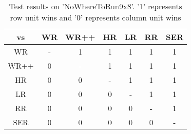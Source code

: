 \begin{table}[h]
    \centering
    \caption{Test results on 'NoWhereToRun9x8'. '1' represents row unit wins and '0' represents column unit wins}
    \label{table:NoWhereToRun9x8}
    \begin{tabular}{c|cccccc}
        \toprule
        vs & WR & WR++ & HR & LR & RR & SER \\
        \midrule
        WR          & - & 1 & 1 & 1 & 1 & 1 \\
        WR++  & 0 & - & 1 & 1 & 1 & 1 \\
        HR           & 0 & 0 & - & 1 & 1 & 1 \\
        LR           & 0 & 0 & 0 & - & 1 & 1 \\
        RR          & 0 & 0 & 0 & 0 & - & 1 \\
        SER  & 0 & 0 & 0 & 0 & 0 & - \\
        \bottomrule
    \end{tabular}
\end{table}